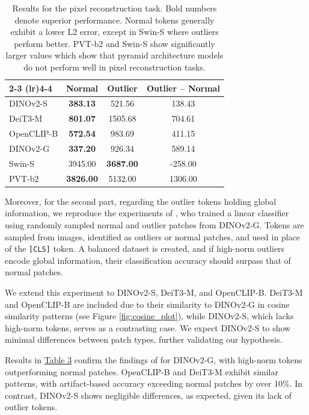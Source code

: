 \documentclass[10pt]{article} %
\begin{document}
\begin{table}[htbp]
\begin{minipage}{0.48\linewidth}
{\begin{tabular}{l c c c}
    \cmidrule(lr){2-3} \cmidrule(lr){4-4}
     & \textbf{Normal} & \textbf{Outlier} & \textbf{Outlier – Normal} \\
    \midrule
    DINOv2-S   & \textbf{383.13} & 521.56  & 138.43 \\
    DeiT3-M    & \textbf{801.07} & 1505.68 & 704.61 \\
    OpenCLIP-B & \textbf{572.54} & 983.69  & 411.15 \\
    DINOv2-G   & \textbf{337.20} & 926.34  & 589.14 \\
    Swin-S     & 3945.00 & \textbf{3687.00} & -258.00 \\
    PVT-b2     & \textbf{3826.00} & 5132.00 & 1306.00 \\
    \bottomrule
    \end{tabular}}
    \caption{Results for the pixel reconstruction task. Bold numbers denote superior performance. Normal tokens generally exhibit a lower L2 error, except in Swin-S where outliers perform better. PVT-b2 and Swin-S show significantly larger values which show that pyramid architecture models do not perform well in pixel reconstruction tasks.}
    \label{tab:pixel_recon_results}
\end{minipage}
\end{table}

Moreover, for the second part, regarding the outlier tokens holding global information, we reproduce the experiments of \citet{darcet2024registers}, who trained a linear classifier using randomly sampled normal and outlier patches from DINOv2-G. Tokens are sampled from images, identified as outliers or normal patches, and used in place of the \texttt{[CLS]} token. A balanced dataset is created, and if high-norm outliers encode global information, their classification accuracy should surpass that of normal patches.

We extend this experiment to DINOv2-S, DeiT3-M, and OpenCLIP-B. DeiT3-M and OpenCLIP-B are included due to their similarity to DINOv2-G in cosine similarity patterns (see Figure \ref{fig:cosine_plot}), while DINOv2-S, which lacks high-norm tokens, serves as a contrasting case. We expect DINOv2-S to show minimal differences between patch types, further validating our hypothesis.

Results in \hyperref[tab:image_classification_results]{Table 3} confirm the findings of \citet{darcet2024registers} for DINOv2-G, with high-norm tokens outperforming normal patches. OpenCLIP-B and DeiT3-M exhibit similar patterns, with artifact-based accuracy exceeding normal patches by over 10\%. In contrast, DINOv2-S shows negligible differences, as expected, given its lack of outlier tokens.
\end{document}
